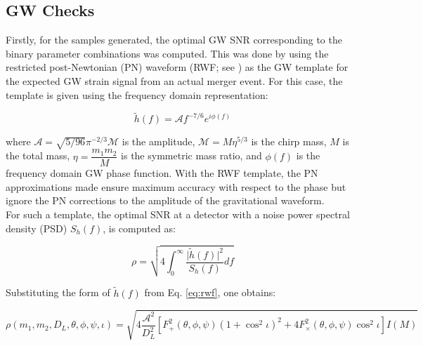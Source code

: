     \subsection{GW Checks}\label{sub:gw_checks}

        Firstly, for the samples generated, the optimal GW SNR corresponding to the
        binary parameter combinations was computed. This was done by using the
        restricted post-Newtonian (PN) waveform (RWF; see \cite{cutler_1994}) as the GW
        template for the expected GW strain signal from an actual merger event. For this
        case, the template is given using the frequency domain representation:

        \begin{equation}
            \tilde{h}(f) = \mathcal{A}f^{-7/6}e^{i\phi(f)}
            \label{eq:rwf}
        \end{equation}

        where $\mathcal{A} = \sqrt{5/96}\pi^{-2/3} \mathcal{M}$ is the amplitude,
        $\mathcal{M} = M \eta^{5/3}$ is the chirp mass, $M$ is the total mass, $\eta =
        \dfrac{m_1 m_2}{M}$ is the symmetric mass ratio, and $\phi(f)$ is the frequency
        domain GW phase function. With the RWF template, the PN approximations made
        ensure maximum accuracy with respect to the phase but ignore the PN corrections
        to the amplitude of the gravitational waveform.\\
        For such a template, the optimal SNR at a  detector with a noise power spectral
        density (PSD) $S_h(f)$, is computed as:

        \begin{equation}
            \rho = \sqrt{
                            4\int_0^\infty
                            \dfrac{\lvert \tilde{h}(f) \rvert^2}{S_h(f)}
                            df
                        }
        \end{equation}

        Substituting the form of $\tilde{h}(f)$ from Eq. \ref{eq:rwf}, one obtains:

        \begin{equation}
            \rho(m_1, m_2, D_L, \theta, \phi, \psi, \iota) = \sqrt{
                4 \dfrac{\mathcal{A}^2}{D_L^2}
                \left[
                    F_{+}^2(\theta, \phi, \psi)(1 + \cos^2 \iota)^2 +
                    4 F_{\times}^2(\theta, \phi, \psi) \cos^2 \iota
                \right]
                 I(M)
                }
        \end{equation}

